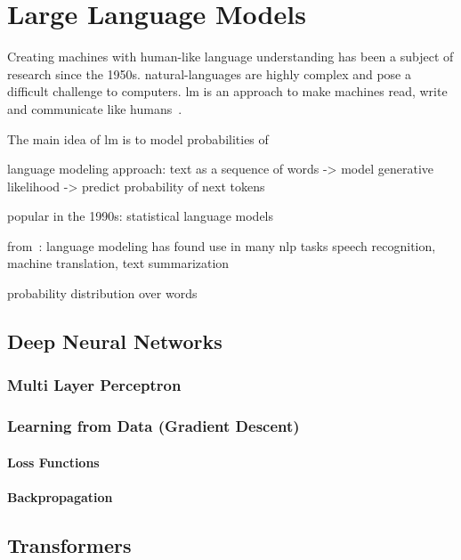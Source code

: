 \chapter{Large Language Models}\label{ch:techOverview}

Creating machines with human-like language understanding has been a subject of research since the 1950s.
\gls{natural-language}s are highly complex and pose a difficult challenge to computers.
\gls{lm} is an approach to make machines read, write and communicate like humans~\autocite{zhao2023survey}.

The main idea of \gls{lm} is to model probabilities of

language modeling approach: text as a sequence of words -> model generative likelihood
-> predict probability of next tokens

popular in the 1990s: statistical language models


from~\autocite{jozefowicz2016exploring}:
language modeling has found use in many \gls{nlp} tasks
speech recognition, machine translation, text summarization

probability distribution over words~\autocite{de2015survey}




\section{Deep Neural Networks}\label{sec:dnn}

\subsection{Multi Layer Perceptron}\label{subsec:multi-layer-perceptron}

\subsection{Learning from Data (Gradient Descent)}\label{subsec:learning-from-data}

\subsubsection{Loss Functions}

\subsubsection{Backpropagation}

\section{Transformers}\label{sec:trans}

